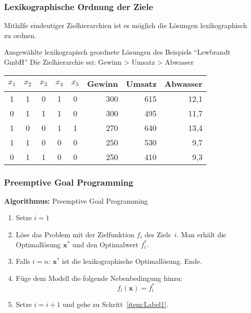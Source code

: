 \begin{frame}
 \frametitle{Lexikographische Ordnung der Ziele}
 Mithilfe eindeutiger Zielhierarchien ist es möglich die Lösungen lexikographisch zu ordnen.
 
 \begin{block}{Ausgewählte lexikograpisch geordnete Lösungen des Beispiels "`Lewbrandt GmbH"'}
 Die Zielhierarchie sei: Gewinn > Umsatz > Abwasser\par
 \footnotesize
 \centering
 \begin{tabular}{*{5}{c}rrr}
  \toprule
  $x_1$ & $x_2$ & $x_3$ & $x_4$ & $x_5$ & \scriptsize Gewinn & \scriptsize Umsatz & \scriptsize Abwasser \\
  \midrule
  1&	1&	0&	1&	0&	300&	615&	12,1\\
  0&	1&	1&	1&	0&	300&	495&	11,7\\
  1&	0&	0&	1&	1&	270&	640&	13,4\\
  1&	1&	0&	0&	0&	250&	530&	9,7\\
  0&	1&	1&	0&	0&	250&	410&	9,3\\
  \bottomrule
 \end{tabular}
 \end{block}
\end{frame}

\begin{frame}
 \frametitle{Preemptive Goal Programming}
 \textbf{Algorithmus:} Preemptive Goal Programming
  \addtolength{\abovedisplayskip}{-2ex}
  \addtolength{\belowdisplayskip}{-2ex}
  \begin{enumerate}
  \item Setze $i=1$
  \item \label{item:Label1} Löse das Problem mit der Zielfunktion $f_i$ des Ziels~$i$. Man erhält die Optimallösung $\mathbf{x}^*$ und den Optimalwert $f_i^*$.
  \item Falls $i=n$: $\mathbf{x}^*$ ist die lexikographische Optimallösung. Ende.
  \item Füge dem Modell die folgende Nebenbedingung hinzu: \[f_i(\mathbf{x}) = f_i^*\]
  \item Setze $i=i+1$ und gehe zu Schritt~\ref{item:Label1}.
  \end{enumerate}
  \addtolength{\abovedisplayskip}{2ex}
  \addtolength{\belowdisplayskip}{2ex}
\end{frame}



